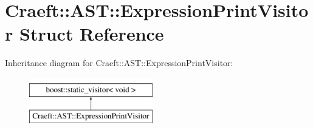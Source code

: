 \hypertarget{struct_craeft_1_1_a_s_t_1_1_expression_print_visitor}{}\section{Craeft\+:\+:A\+ST\+:\+:Expression\+Print\+Visitor Struct Reference}
\label{struct_craeft_1_1_a_s_t_1_1_expression_print_visitor}
Inheritance diagram for Craeft\+:\+:A\+ST\+:\+:Expression\+Print\+Visitor\+:\begin{figure}[H]
\begin{center}
\leavevmode
\includegraphics[height=2.000000cm]{struct_craeft_1_1_a_s_t_1_1_expression_print_visitor}
\end{center}
\end{figure}
